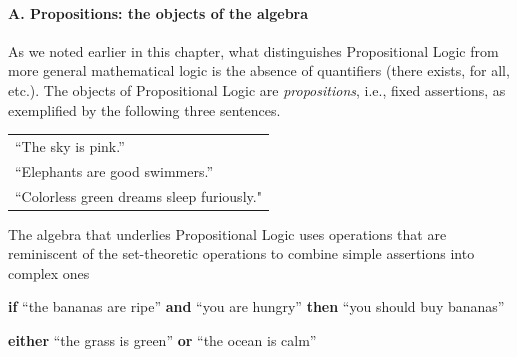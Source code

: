 \paragraph{A. Propositions: the objects of the algebra}

\noindent
As we noted earlier in this chapter, what distinguishes Propositional
Logic from more general mathematical logic is the absence of
quantifiers ({\sc there exists}, {\sc for all}, etc.).  The objects of
Propositional Logic are {\it propositions}, i.e., fixed assertions, as
exemplified by the following three sentences.

\smallskip

\begin{tabular}{l}
``The sky is pink.'' \\
``Elephants are good swimmers.'' \\ 
``Colorless green dreams sleep furiously."
\end{tabular}


\bigskip

\noindent {}

\bigskip

The algebra that underlies Propositional Logic uses operations that are reminiscent of the set-theoretic operations to combine simple assertions into complex ones

\smallskip

{\bf if} ``the bananas are ripe'' {\bf and} ``you are hungry'' {\bf then} ``you should buy bananas''

\smallskip

{\bf either} ``the grass is green'' {\bf or} ``the ocean is calm''

